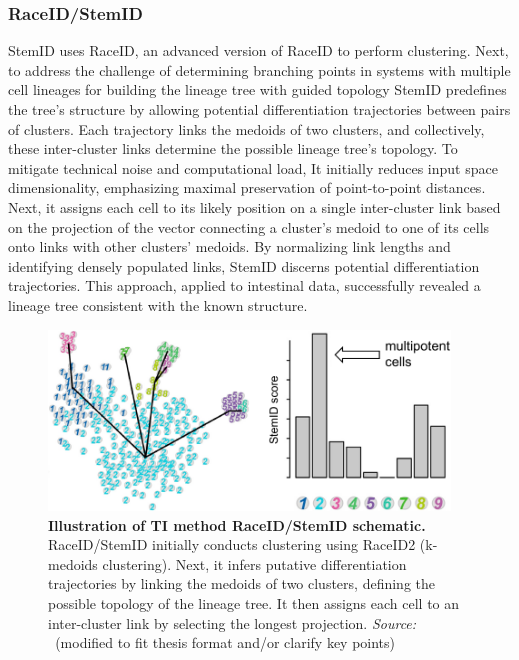 \subsubsection{RaceID/StemID} 
StemID\citep{grun2016stemid} uses RaceID\citep{grun2015raceid}, an advanced version of RaceID to perform clustering. Next, to address the challenge of determining branching points in systems with multiple cell lineages for building the lineage tree with guided topology StemID predefines the tree's structure by allowing potential differentiation trajectories between pairs of clusters. Each trajectory links the medoids of two clusters, and collectively, these inter-cluster links determine the possible lineage tree's topology. To mitigate technical noise and computational load, It initially reduces input space dimensionality, emphasizing maximal preservation of point-to-point distances. Next, it assigns each cell to its likely position on a single inter-cluster link based on the projection of the vector connecting a cluster's medoid to one of its cells onto links with other clusters' medoids. By normalizing link lengths and identifying densely populated links, StemID discerns potential differentiation trajectories. This approach, applied to intestinal data, successfully revealed a lineage tree consistent with the known structure.
\begin{figure}[ht!]
	\centering
	\includegraphics[width=0.95\textwidth]{TI_Alg_StemID/fig}
	\vspace{0.1cm}
	\caption[Illustration of TI method RaceID/StemID schematic.]{\textbf{Illustration of TI method RaceID/StemID schematic.} 
	RaceID/StemID initially conducts clustering using RaceID2 (k-medoids clustering). Next, it infers putative differentiation trajectories by linking the medoids of two clusters, defining the possible topology of the lineage tree. It then assigns each cell to an inter-cluster link by selecting the longest projection. \emph{Source: ~\cite{albergante2020ElPiGraph}}(modified to fit thesis format and/or clarify key points)
	}
	\label{fig:TI_Alg_StemID}
\end{figure}

